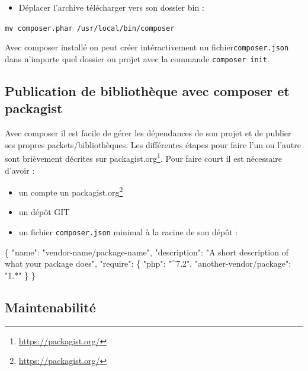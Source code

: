 \documentclass[11pt,a4paper,krantz2,11pt,oneside]{krantz}
\newenvironment{Shaded}{\begin{snugshade}}{\end{snugshade}}
\newcommand{\DataTypeTok}[1]{\textcolor[rgb]{0.27,0.27,0.27}{#1}}
\newcommand{\FunctionTok}[1]{\textcolor[rgb]{0,0,0}{#1}}
\newcommand{\StringTok}[1]{\textcolor[rgb]{0.5,0.5,0.5}{#1}}
\providecommand{\tightlist}{%
  \setlength{\itemsep}{0pt}\setlength{\parskip}{0pt}}
\renewcommand{\href}[2]{#2\footnote{\url{#1}}}
\begin{document}
\begin{itemize}
\tightlist
\item
  Déplacer l'archive télécharger vers son dossier bin :
\end{itemize}

\texttt{mv\ composer.phar\ /usr/local/bin/composer}

Avec composer installé on peut créer intéractivement un fichier\texttt{composer.json} dans n'importe quel dossier ou projet avec la commande \texttt{composer\ init}.

\hypertarget{publication-de-bibliothuxe8que-avec-composer-et-packagist}{%
\subsection{Publication de bibliothèque avec composer et packagist}\label{publication-de-bibliothuxe8que-avec-composer-et-packagist}}

Avec composer il est facile de gérer les dépendances de son projet et de publier ses propres packets/bibliothèques. Les différentes étapes pour faire l'un ou l'autre sont brièvement décrites sur \href{https://packagist.org/}{packagist.org}. Pour faire court il est nécessaire d'avoir :

\begin{itemize}
\tightlist
\item
  un compte un \href{https://packagist.org/}{packagist.org}
\item
  un dépôt GIT
\item
  un fichier \texttt{composer.json} minimal à la racine de son dépôt :
\end{itemize}

\begin{Shaded}
\begin{Highlighting}[]
\FunctionTok{\{}
    \DataTypeTok{"name"}\FunctionTok{:} \StringTok{"vendor-name/package-name"}\FunctionTok{,}
    \DataTypeTok{"description"}\FunctionTok{:} \StringTok{"A short description of what your package does"}\FunctionTok{,}
    \DataTypeTok{"require"}\FunctionTok{:} \FunctionTok{\{}
        \DataTypeTok{"php"}\FunctionTok{:} \StringTok{"^7.2"}\FunctionTok{,}
        \DataTypeTok{"another-vendor/package"}\FunctionTok{:} \StringTok{"1.*"}
    \FunctionTok{\}}
\FunctionTok{\}}
\end{Highlighting}
\end{Shaded}

\hypertarget{maintenabilituxe9}{%
\subsection{Maintenabilité}\label{maintenabilituxe9}}
\end{document}
